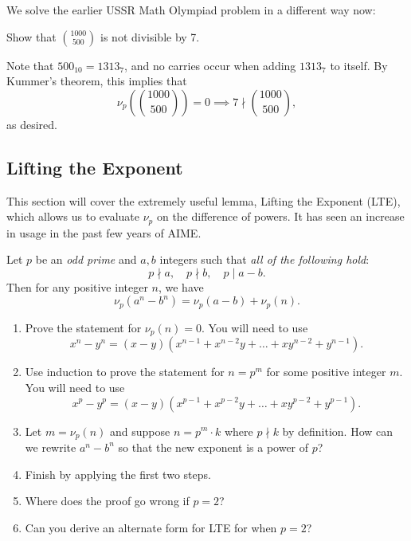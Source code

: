 \documentclass[blue,onecol]{shooting}
\begin{document}
We solve the earlier USSR Math Olympiad problem in a different way now:
\begin{exam}
    Show that $\binom{1000}{500}$ is not divisible by 7.
\end{exam}

\begin{sol}
    Note that $500_{10}=1313_7$, and no carries occur when adding $1313_7$ to itself. By Kummer's theorem, this implies that \[\nu_p\left( \binom{1000}{500} \right)=0\implies 7\nmid \binom{1000}{500},\] as desired.
\end{sol}
\subsection{Lifting the Exponent}
This section will cover the extremely useful lemma, Lifting the Exponent (LTE), which allows us to evaluate $\nu_p$ on the difference of powers. It has seen an increase in usage in the past few years of AIME.\\

\begin{theo}[LTE]
    Let $p$ be an \emph{odd prime} and $a,b$ integers such that \emph{all of the following hold}: \[p\nmid a,\quad p\nmid b,\quad p\mid a-b.\] Then for any positive integer $n$, we have \[\nu_p(a^n-b^n)=\nu_p(a-b)+\nu_p(n).\]
\end{theo}

\begin{walk}
    \begin{enumerate}
        \item Prove the statement for $\nu_p(n)=0$. You will need to use \[x^n-y^n=(x-y)\left(x^{n-1}+x^{n-2}y+\dots+xy^{n-2}+y^{n-1}\right).\]
        \item Use induction to prove the statement for $n=p^m$ for some positive integer $m$. You will need to use \[x^p-y^p=(x-y)\left(x^{p-1}+x^{p-2}y+\dots+xy^{p-2}+y^{p-1}\right).\]
        \item Let $m=\nu_p(n)$ and suppose $n=p^m\cdot k$ where $p\nmid k$ by definition. How can we rewrite $a^n-b^n$ so that the new exponent is a power of $p$?
        \item Finish by applying the first two steps.
        \item Where does the proof go wrong if $p=2$?
        \item Can you derive an alternate form for LTE for when $p=2$?
    \end{enumerate}
\end{walk}
\end{document}
